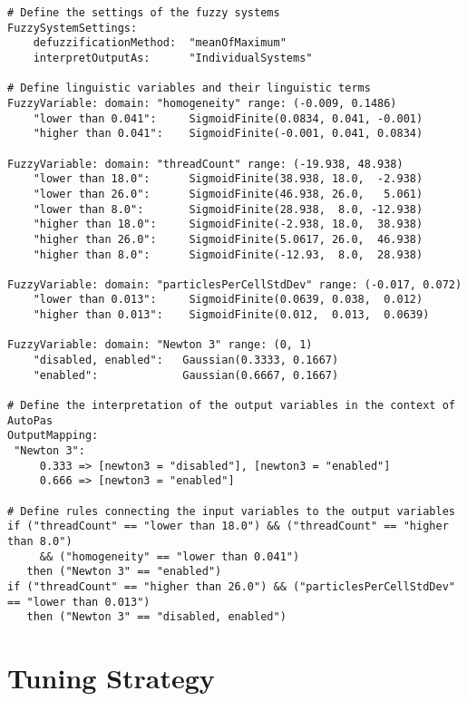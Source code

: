 \begin{lstlisting}[caption={Demonstration of the domain-specific language used for Fuzzy Tuning},label={lst:rulefile},language=FuzzyLanguage]
# Define the settings of the fuzzy systems
FuzzySystemSettings:
    defuzzificationMethod:  "meanOfMaximum"
    interpretOutputAs:      "IndividualSystems"

# Define linguistic variables and their linguistic terms
FuzzyVariable: domain: "homogeneity" range: (-0.009, 0.1486)
    "lower than 0.041":     SigmoidFinite(0.0834, 0.041, -0.001)
    "higher than 0.041":    SigmoidFinite(-0.001, 0.041, 0.0834)

FuzzyVariable: domain: "threadCount" range: (-19.938, 48.938)
    "lower than 18.0":      SigmoidFinite(38.938, 18.0,  -2.938)
    "lower than 26.0":      SigmoidFinite(46.938, 26.0,   5.061)
    "lower than 8.0":       SigmoidFinite(28.938,  8.0, -12.938)
    "higher than 18.0":     SigmoidFinite(-2.938, 18.0,  38.938)
    "higher than 26.0":     SigmoidFinite(5.0617, 26.0,  46.938)
    "higher than 8.0":      SigmoidFinite(-12.93,  8.0,  28.938)
     
FuzzyVariable: domain: "particlesPerCellStdDev" range: (-0.017, 0.072)
    "lower than 0.013":     SigmoidFinite(0.0639, 0.038,  0.012)
    "higher than 0.013":    SigmoidFinite(0.012,  0.013,  0.0639)
  
FuzzyVariable: domain: "Newton 3" range: (0, 1)
    "disabled, enabled":   Gaussian(0.3333, 0.1667)
    "enabled":             Gaussian(0.6667, 0.1667)
      
# Define the interpretation of the output variables in the context of AutoPas
OutputMapping:
 "Newton 3":
     0.333 => [newton3 = "disabled"], [newton3 = "enabled"]
     0.666 => [newton3 = "enabled"]

# Define rules connecting the input variables to the output variables
if ("threadCount" == "lower than 18.0") && ("threadCount" == "higher than 8.0") 
     && ("homogeneity" == "lower than 0.041")
   then ("Newton 3" == "enabled")
if ("threadCount" == "higher than 26.0") && ("particlesPerCellStdDev" == "lower than 0.013")
   then ("Newton 3" == "disabled, enabled")
\end{lstlisting}



\section{Tuning Strategy}

